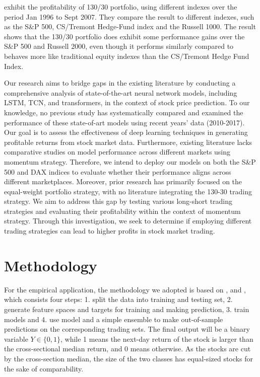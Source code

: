 \documentclass{article}
\begin{document}
\cite{lo2008130} exhibit the profitability of 130/30 portfolio, using different indexes over the period Jan 1996 to Sept 2007. They compare the result to different indexes, such as the S\&P 500, CS/Tremont Hedge-Fund index and the Russell 1000. The result shows that the 130/30 portfolio does exhibit some performance gains over the S\&P 500 and Russell 2000, even though it performs similarly compared to behaves more like traditional equity indexes than the CS/Tremont Hedge Fund Index.

Our research aims to bridge gaps in the existing literature by conducting a comprehensive analysis of state-of-the-art neural network models, including LSTM, TCN, and transformers, in the context of stock price prediction. To our knowledge, no previous study has systematically compared and examined the performance of these state-of-art models using recent years' data (2010-2017). Our goal is to assess the effectiveness of deep learning techniques in generating profitable returns from stock market data. Furthermore, existing literature lacks comparative studies on model performance across different markets using momentum strategy. Therefore, we intend to deploy our models on both the S\&P 500 and DAX indices to evaluate whether their performance aligns across different marketplaces. Moreover, prior research has primarily focused on the equal-weight portfolio strategy, with no literature integrating the 130-30 trading strategy. We aim to address this gap by testing various long-short trading strategies and evaluating their profitability within the context of momentum strategy. Through this investigation, we seek to determine if employing different trading strategies can lead to higher profits in stock market trading.

\section{Methodology}
\label{methodology}
For the empirical application, the methodology we adopted is based on \cite{krauss2017deep}, \cite{fischer2018deep} and \cite{takeuchi2013applying}, which consists four steps: 1. split the data into training and testing set, 2. generate feature spaces and targets for training and making prediction, 3. train models and 4. use model and a simple ensemble to make out-of-sample predictions on the corresponding trading sets. The final output will be a binary variable \begin{math} Y \in \{0,1\} \end{math}, while 1 means the next-day return of the stock is larger than the cross-sectional median return, and 0 means otherwise. As the stocks are cut by the cross-section median, the size of the two classes has equal-sized stocks for the sake of comparability. 
\end{document}

